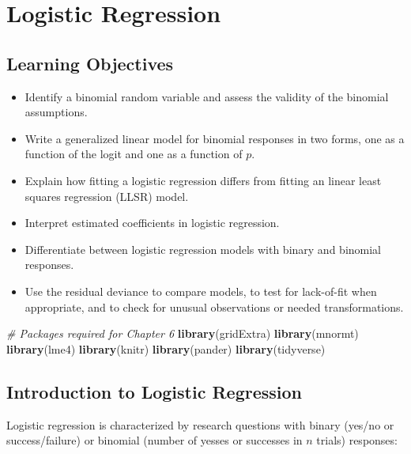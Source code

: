 \documentclass[
]{krantz}
\newenvironment{Shaded}{\begin{snugshade}}{\end{snugshade}}
\newcommand{\CommentTok}[1]{\textcolor[rgb]{0.37,0.37,0.37}{\textit{#1}}}
\newcommand{\KeywordTok}[1]{\textcolor[rgb]{0.27,0.27,0.27}{\textbf{#1}}}
\newcommand{\NormalTok}[1]{#1}
\providecommand{\tightlist}{%
  \setlength{\itemsep}{0pt}\setlength{\parskip}{0pt}}
\begin{document}
\hypertarget{ch-logreg}{%
\chapter{Logistic Regression}\label{ch-logreg}}

\hypertarget{learning-objectives-5}{%
\section{Learning Objectives}\label{learning-objectives-5}}

\begin{itemize}
\tightlist
\item
  Identify a binomial random variable and assess the validity of the binomial assumptions.
\item
  Write a generalized linear model for binomial responses in two forms, one as a function of the logit and one as a function of \(p\).
\item
  Explain how fitting a logistic regression differs from fitting an linear least squares regression (LLSR) model.
\item
  Interpret estimated coefficients in logistic regression.
\item
  Differentiate between logistic regression models with binary and binomial responses.
\item
  Use the residual deviance to compare models, to test for lack-of-fit when appropriate, and to check for unusual observations or needed transformations.
\end{itemize}

\begin{Shaded}
\begin{Highlighting}[]
\CommentTok{# Packages required for Chapter 6}
\KeywordTok{library}\NormalTok{(gridExtra)  }
\KeywordTok{library}\NormalTok{(mnormt) }
\KeywordTok{library}\NormalTok{(lme4) }
\KeywordTok{library}\NormalTok{(knitr) }
\KeywordTok{library}\NormalTok{(pander)}
\KeywordTok{library}\NormalTok{(tidyverse)}
\end{Highlighting}
\end{Shaded}

\hypertarget{introduction-to-logistic-regression}{%
\section{Introduction to Logistic Regression}\label{introduction-to-logistic-regression}}

Logistic regression is characterized by research questions with binary (yes/no or success/failure) or binomial (number of yesses or successes in \(n\) trials) responses:
\end{document}
